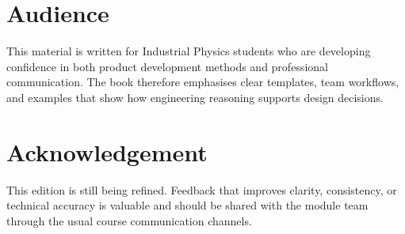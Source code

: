 \section*{Audience}

This material is written for Industrial Physics students who are developing confidence in both product development methods and professional communication. The book therefore emphasises clear templates, team workflows, and examples that show how engineering reasoning supports design decisions.

\section*{Acknowledgement}

This edition is still being refined. Feedback that improves clarity, consistency, or technical accuracy is valuable and should be shared with the module team through the usual course communication channels.
